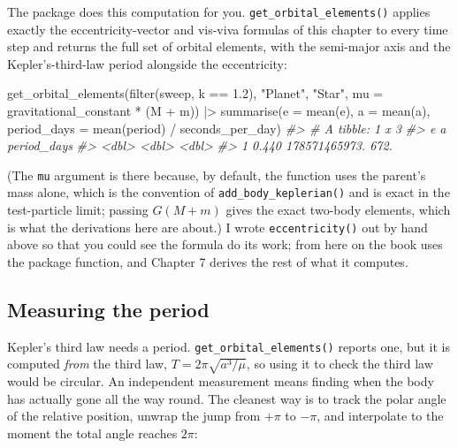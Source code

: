 \documentclass[
  10.5pt,
  letterpaper,
]{scrbook}
\newenvironment{Shaded}{\begin{snugshade}}{\end{snugshade}}
\newcommand{\AttributeTok}[1]{\textcolor[rgb]{0.00,0.00,0.00}{#1}}
\newcommand{\CommentTok}[1]{\textcolor[rgb]{0.00,0.00,0.00}{\textit{#1}}}
\newcommand{\FloatTok}[1]{\textcolor[rgb]{0.00,0.00,0.00}{#1}}
\newcommand{\FunctionTok}[1]{\textcolor[rgb]{0.00,0.00,0.00}{#1}}
\newcommand{\NormalTok}[1]{\textcolor[rgb]{0.00,0.00,0.00}{#1}}
\newcommand{\SpecialCharTok}[1]{\textcolor[rgb]{0.00,0.00,0.00}{#1}}
\newcommand{\StringTok}[1]{\textcolor[rgb]{0.00,0.00,0.00}{#1}}
\theoremstyle{plain}
\theoremstyle{remark}
\begin{document}
The package does this computation for you.
\texttt{get\_orbital\_elements()} applies exactly the
eccentricity-vector and vis-viva formulas of this chapter to every time
step and returns the full set of orbital elements, with the semi-major
axis and the Kepler's-third-law period alongside the eccentricity:

\begin{Shaded}
\begin{Highlighting}[]
\FunctionTok{get\_orbital\_elements}\NormalTok{(}\FunctionTok{filter}\NormalTok{(sweep, k }\SpecialCharTok{==} \FloatTok{1.2}\NormalTok{), }\StringTok{"Planet"}\NormalTok{, }\StringTok{"Star"}\NormalTok{,}
                     \AttributeTok{mu =}\NormalTok{ gravitational\_constant }\SpecialCharTok{*}\NormalTok{ (M }\SpecialCharTok{+}\NormalTok{ m)) }\SpecialCharTok{|\textgreater{}}
  \FunctionTok{summarise}\NormalTok{(}\AttributeTok{e =} \FunctionTok{mean}\NormalTok{(e), }\AttributeTok{a =} \FunctionTok{mean}\NormalTok{(a), }\AttributeTok{period\_days =} \FunctionTok{mean}\NormalTok{(period) }\SpecialCharTok{/}\NormalTok{ seconds\_per\_day)}
\CommentTok{\#\textgreater{} \# A tibble: 1 x 3}
\CommentTok{\#\textgreater{}       e             a period\_days}
\CommentTok{\#\textgreater{}   \textless{}dbl\textgreater{}         \textless{}dbl\textgreater{}       \textless{}dbl\textgreater{}}
\CommentTok{\#\textgreater{} 1 0.440 178571465973.        672.}
\end{Highlighting}
\end{Shaded}

(The \texttt{mu} argument is there because, by default, the function
uses the parent's mass alone, which is the convention of
\texttt{add\_body\_keplerian()} and is exact in the test-particle limit;
passing \(G(M+m)\) gives the exact two-body elements, which is what the
derivations here are about.) I wrote \texttt{eccentricity()} out by hand
above so that you could see the formula do its work; from here on the
book uses the package function, and Chapter 7 derives the rest of what
it computes.

\subsection{Measuring the period}\label{measuring-the-period}

Kepler's third law needs a period. \texttt{get\_orbital\_elements()}
reports one, but it is computed \emph{from} the third law,
\(T = 2\pi\sqrt{a^3/\mu}\), so using it to check the third law would be
circular. An independent measurement means finding when the body has
actually gone all the way round. The cleanest way is to track the polar
angle of the relative position, unwrap the jump from \(+\pi\) to
\(-\pi\), and interpolate to the moment the total angle reaches
\(2\pi\):
\end{document}
